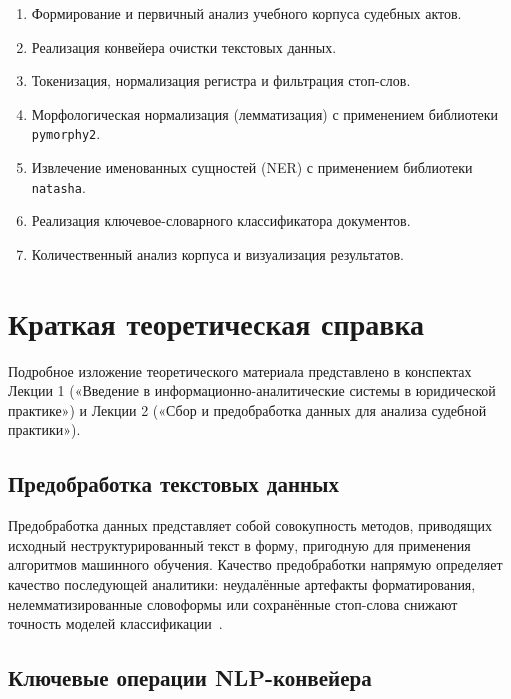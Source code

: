 \documentclass[12pt, a4paper]{report}
\begin{document}
\begin{enumerate}
  \item Формирование и первичный анализ учебного корпуса судебных актов.
  \item Реализация конвейера очистки текстовых данных.
  \item Токенизация, нормализация регистра и фильтрация стоп-слов.
  \item Морфологическая нормализация (лемматизация) с применением библиотеки \texttt{pymorphy2}.
  \item Извлечение именованных сущностей (NER) с применением библиотеки \texttt{natasha}.
  \item Реализация ключевое-словарного классификатора документов.
  \item Количественный анализ корпуса и визуализация результатов.
\end{enumerate}

\chapter{Краткая теоретическая справка}

\begin{tcolorbox}[infobox, title={Источники}]
  Подробное изложение теоретического материала представлено в конспектах Лекции 1
  («Введение в информационно-аналитические системы в юридической практике»)
  и Лекции 2 («Сбор и предобработка данных для анализа судебной практики»).
\end{tcolorbox}

\vspace{8pt}

\section{Предобработка текстовых данных}

Предобработка данных представляет собой совокупность методов, приводящих исходный
неструктурированный текст в форму, пригодную для применения алгоритмов машинного обучения.
Качество предобработки напрямую определяет качество последующей аналитики: неудалённые
артефакты форматирования, нелемматизированные словоформы или сохранённые стоп-слова снижают
точность моделей классификации~\cite{lec2}.

\section{Ключевые операции NLP-конвейера}
\end{document}
